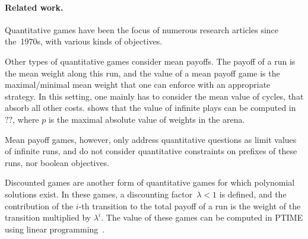 \paragraph{Related work.}
Quantitative games have been the focus of numerous research articles
 since the~1970s, with various kinds of objectives. 



Other types of quantitative games consider mean payoffs. The payoff
of a run is the mean weight along this run, and the value of a
mean payoff game is the maximal/minimal mean weight that one can
enforce with an appropriate strategy. In this setting, one mainly has
to consider the mean value of cycles, that absorb all other
costs. \cite{ZwickP95} shows that the value of infinite plays can be
computed in $??$, where $p$ is the
maximal absolute value of weights in the arena.

Mean payoff games, however, only address quantitative questions as
limit values of infinite runs, and do not consider quantitative
constraints on prefixes of these runs, nor boolean objectives.

Discounted games are another form of quantitative games for which
polynomial solutions exist. In these games, a discounting
factor~$\lambda < 1$ is defined, and the contribution of the $i$-th
transition to the total payoff of a run is the weight of the
transition multiplied by $\lambda^i$. The value of these games can be
computed in PTIME using linear programming~\cite{Andersson06}.



